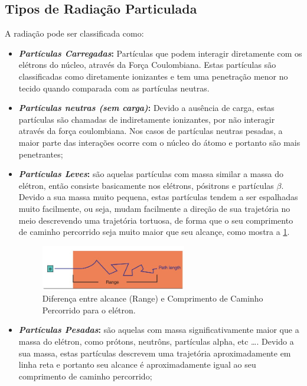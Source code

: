 \documentclass[11pt,a4paper]{article}
\begin{document}
       \subsection{Tipos de Radiação Particulada}

            A radiação pode ser classificada como:

            \begin{itemize}
                \item \textbf{\textit{\textcolor{CarnationPink}{Partículas Carregadas}}:} Partículas que podem interagir diretamente com os elétrons do núcleo, através da Força Coulombiana. Estas partículas são classificadas como diretamente ionizantes e tem uma penetração menor no tecido quando comparada com as partículas neutras.
                
                \item \textbf{\textit{\textcolor{CarnationPink}{Partículas neutras (sem carga)}}:}  Devido a ausência de carga, estas partículas são chamadas de indiretamente ionizantes, por não interagir através da força coulombiana. Nos casos de partículas neutras pesadas, a maior parte das interações ocorre com o núcleo do átomo e portanto são mais penetrantes; 
                
                \item \textbf{\textit{\textcolor{CarnationPink}{Partículas Leves}}:} são aquelas partículas com massa similar a massa do elétron, então consiste basicamente nos elétrons, pósitrons e partículas $\beta$. Devido a sua massa muito pequena, estas partículas tendem a ser espalhadas muito facilmente, ou seja, mudam facilmente a direção de sua trajetória no meio descrevendo uma trajetória tortuosa, de forma que o seu comprimento de caminho percorrido  seja muito maior que seu alcançe, como mostra a \ref{fig:alcanceECaminhoPercorrido}.

                    \begin{figure}[h]
                        \centering
                        \includegraphics[width=0.6\textwidth]{Imagens/alcanceECaminhoPercorrido.JPG}
                        \caption{Diferença entre alcance (Range) e Comprimento de Caminho Percorrido para o elétron.}
                        \label{fig:alcanceECaminhoPercorrido}
                    \end{figure}

                \item \textbf{\textit{\textcolor{CarnationPink}{Partículas Pesadas}}:} são aquelas com massa significativamente maior que a massa do elétron, como prótons, neutrôns, partículas alpha, etc \dots. Devido a sua massa, estas partículas descrevem uma trajetória aproximadamente em linha reta e portanto seu alcance é aproximadamente igual ao seu comprimento de caminho percorrido; 

            \end{itemize}
\end{document}
